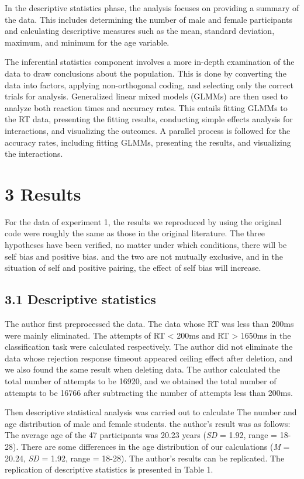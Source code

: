 \documentclass[
  man]{apa6}
\begin{document}
In the descriptive statistics phase, the analysis focuses on providing a summary of the data. This includes determining the number of male and female participants and calculating descriptive measures such as the mean, standard deviation, maximum, and minimum for the age variable.

The inferential statistics component involves a more in-depth examination of the data to draw conclusions about the population. This is done by converting the data into factors, applying non-orthogonal coding, and selecting only the correct trials for analysis. Generalized linear mixed models (GLMMs) are then used to analyze both reaction times and accuracy rates. This entails fitting GLMMs to the RT data, presenting the fitting results, conducting simple effects analysis for interactions, and visualizing the outcomes. A parallel process is followed for the accuracy rates, including fitting GLMMs, presenting the results, and visualizing the interactions.

\section{3 Results}\label{results}

For the data of experiment 1, the results we reproduced by using the original code were roughly the same as those in the original literature. The three hypotheses have been verified, no matter under which conditions, there will be self bias and positive bias. and the two are not mutually exclusive, and in the situation of self and positive pairing, the effect of self bias will increase.

\subsection{3.1 Descriptive statistics}\label{descriptive-statistics}

The author first preprocessed the data. The data whose RT was less than 200ms were mainly eliminated. The attempts of RT \textless{} 200ms and RT \textgreater{} 1650ms in the classification task were calculated respectively. The author did not eliminate the data whose rejection response timeout appeared ceiling effect after deletion, and we also found the same result when deleting data. The author calculated the total number of attempts to be 16920, and we obtained the total number of attempts to be 16766 after subtracting the number of attempts less than 200ms.

Then descriptive statistical analysis was carried out to calculate The number and age distribution of male and female students. the author's result was as follows: The average age of the 47 participants was 20.23 years (\emph{SD} = 1.92, range = 18-28). There are some differences in the age distribution of our calculations (\emph{M} = 20.24, \emph{SD} = 1.92, range = 18-28). The author's results can be replicated. The replication of descriptive statistics is presented in Table 1.
\end{document}

